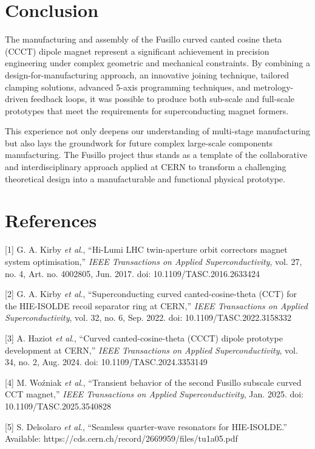 \documentclass[
]{article}
\begin{document}
\section*{Conclusion}

The manufacturing and assembly of the Fusillo curved canted cosine theta
(CCCT) dipole magnet represent a significant achievement in precision
engineering under complex geometric and mechanical constraints. By
combining a design-for-manufacturing approach, an innovative joining
technique, tailored clamping solutions, advanced 5-axis programming
techniques, and metrology-driven feedback loops, it was possible to
produce both sub-scale and full-scale prototypes that meet the
requirements for superconducting magnet formers.

This experience not only deepens our understanding of multi-stage
manufacturing but also lays the groundwork for future complex
large-scale components manufacturing. The Fusillo project thus stands as
a template of the collaborative and interdisciplinary approach applied
at CERN to transform a challenging theoretical design into a
manufacturable and functional physical prototype.

\section*{References}

{[}1{]} G. A. Kirby \emph{et al}., ``Hi-Lumi LHC twin-aperture orbit
correctors magnet system optimisation,'' \emph{IEEE Transactions on
Applied Superconductivity}, vol. 27, no. 4, Art. no. 4002805, Jun. 2017.
doi: 10.1109/TASC.2016.2633424

{[}2{]} G. A. Kirby \emph{et al}., ``Superconducting curved
canted-cosine-theta (CCT) for the HIE-ISOLDE recoil separator ring at
CERN,'' \emph{IEEE Transactions on Applied Superconductivity}, vol. 32,
no. 6, Sep. 2022. doi: 10.1109/TASC.2022.3158332

{[}3{]} A. Haziot \emph{et al}., ``Curved canted-cosine-theta (CCCT)
dipole prototype development at CERN,'' \emph{IEEE Transactions on
Applied Superconductivity}, vol. 34, no. 2, Aug. 2024. doi:
10.1109/TASC.2024.3353149

{[}4{]} M. Woźniak \emph{et al}., ``Transient behavior of the second
Fusillo subscale curved CCT magnet,'' \emph{IEEE Transactions on Applied
Superconductivity}, Jan. 2025. doi: 10.1109/TASC.2025.3540828

{[}5{]} S. Delsolaro \emph{et al}., ``Seamless quarter-wave resonators
for HIE-ISOLDE.'' Available:
https://cds.cern.ch/record/2669959/files/tu1a05.pdf
\end{document}
